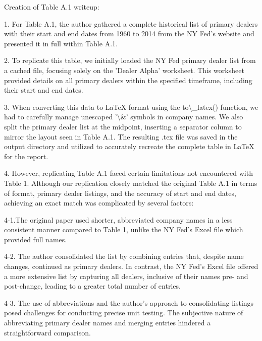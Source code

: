 \documentclass{article}
\begin{document}
\par
Creation of Table A.1 writeup:

1. For Table A.1, the author gathered a complete historical list of primary dealers with their start
and end dates from 1960 to 2014 from the NY Fed's website and presented it in full within Table A.1. 

2. To replicate this table, we initially loaded the NY Fed primary dealer list from a cached file, 
focusing solely on the 'Dealer Alpha' worksheet. This worksheet provided details on all primary dealers 
within the specified timeframe, including their start and end dates.

3. When converting this data to LaTeX format using the to\textbackslash{}_latex() function, we had to carefully manage 
unescaped '\textbackslash{}&' symbols in company names. We also split the primary dealer list at the midpoint, inserting 
a separator column to mirror the layout seen in Table A.1. The resulting .tex file was saved in the output 
directory and utilized to accurately recreate the complete table in LaTeX for the report.

4. However, replicating Table A.1 faced certain limitations not encountered with Table 1. Although our 
replication closely matched the original Table A.1 in terms of format, primary dealer listings, and the 
accuracy of start and end dates, achieving an exact match was complicated by several factors:

4-1.The original paper used shorter, abbreviated company names in a less consistent manner compared to Table 1, 
unlike the NY Fed's Excel file which provided full names.

4-2. The author consolidated the list by combining entries that, despite name changes, continued as primary 
dealers. In contrast, the NY Fed's Excel file offered a more extensive list by capturing all dealers, 
inclusive of their names pre- and post-change, leading to a greater total number of entries.

4-3. The use of abbreviations and the author's approach to consolidating listings posed challenges for conducting 
precise unit testing. The subjective nature of abbreviating primary dealer names and merging entries hindered a 
straightforward comparison.





\par
\end{document}
